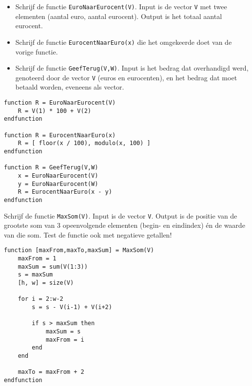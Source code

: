 \begin{oef}
\begin{itemize}
  \item Schrijf de functie \verb/EuroNaarEurocent(V)/. Input is de vector \verb/V/ met twee elementen (aantal euro, aantal eurocent). Output is het totaal aantal eurocent.
  \item Schrijf de functie \verb/EurocentNaarEuro(x)/ die het omgekeerde doet van de vorige functie.
  \item Schrijf de functie \verb/GeefTerug(V,W)/. Input is het bedrag dat overhandigd werd, genoteerd door de vector \verb/V/ (euros en eurocenten), en het bedrag dat moet betaald worden, eveneens als vector.
\end{itemize}
\begin{opl}
\begin{lstlisting}
function R = EuroNaarEurocent(V)
    R = V(1) * 100 + V(2)
endfunction

function R = EurocentNaarEuro(x)
    R = [ floor(x / 100), modulo(x, 100) ]
endfunction

function R = GeefTerug(V,W)
    x = EuroNaarEurocent(V)
    y = EuroNaarEurocent(W)
    R = EurocentNaarEuro(x - y)
endfunction
\end{lstlisting}
\end{opl}
\end{oef}

\begin{oef}
Schrijf de functie \verb/MaxSom(V)/. Input is de vector \verb/V/. Output is de positie van de grootste som
van 3 opeenvolgende elementen (begin- en eindindex) \'en de waarde van die som. Test de functie ook met negatieve getallen!
\begin{opl}
\begin{lstlisting}
function [maxFrom,maxTo,maxSum] = MaxSom(V)
    maxFrom = 1
    maxSum = sum(V(1:3))
    s = maxSum
    [h, w] = size(V)

    for i = 2:w-2
        s = s - V(i-1) + V(i+2)
        
        if s > maxSum then
            maxSum = s
            maxFrom = i
        end
    end
 
    maxTo = maxFrom + 2   
endfunction
\end{lstlisting}
\end{opl}
\end{oef}


